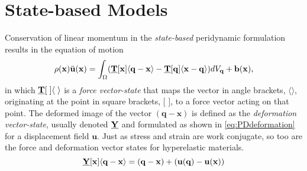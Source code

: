 \section{State-based Models}
Conservation of linear momentum in the \textit{state-based} peridynamic formulation results in the equation of motion
%
\begin{equation}
\label{eq:PDstateEoM}
\rho(\mathbf{x})\ddot{\mathbf{u}}(\mathbf{x}) = \int_\Omega (\vstate{T}{\mathbf{x}}{\mathbf{q}-\mathbf{x}}-\vstate{T}{\mathbf{q}}{\mathbf{x}-\mathbf{q}}) dV_\mathbf{q}  + \mathbf{b}(\mathbf{x}),
\end{equation}
%
in which $\vstate{T}{\;}{\;}$ is a \textit{force vector-state} that maps the vector in angle brackets, $\langle \rangle$, originating at the point in square brackets, [ ], to a force vector acting on that point.
The deformed image of the vector $(\mathbf{q-x})$ is defined as the \textit{deformation vector-state}, usually denoted $\vstate{Y}{}{}$ and formulated as shown in \cref{eq:PDdeformation} for a displacement field \(\mathbf{u}\). 
Just as stress and strain are work conjugate, so too are the force and deformation vector states for hyperelastic materials.
%
\begin{equation}
\label{eq:PDdeformation}
\vstate{Y}{\mathbf{x}}{\mathbf{q}-\mathbf{x}} = (\mathbf{q}-\mathbf{x}) + (\mathbf{u}(\mathbf{q})-\mathbf{u}(\mathbf{x}))
\end{equation}
%

